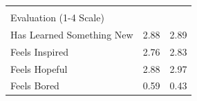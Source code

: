 \documentclass[hideothersubsections, usenames,dvipsnames,10pt]{beamer}
\begin{document}
\begin{frame}
{{\begin{table}[htbp]
\begin{tabular}{lcc}
          																				&       &        \\
    \multicolumn{1}{l}{\textcolor{bdf}{Evaluation (1-4 Scale)}} 								&       &         \\
    \multicolumn{1}{l}{Has Learned Something New} 										& 2.88  & 2.89   \\
    \multicolumn{1}{l}{Feels Inspired} 													& 2.76  & 2.83   \\
    \multicolumn{1}{l}{Feels Hopeful} 													& 2.88  & 2.97  \\
    \multicolumn{1}{l}{Feels Bored} 													& 0.59  & 0.43   \\
    \end{tabular}

\end{table}}}
\end{frame}
\end{document}
